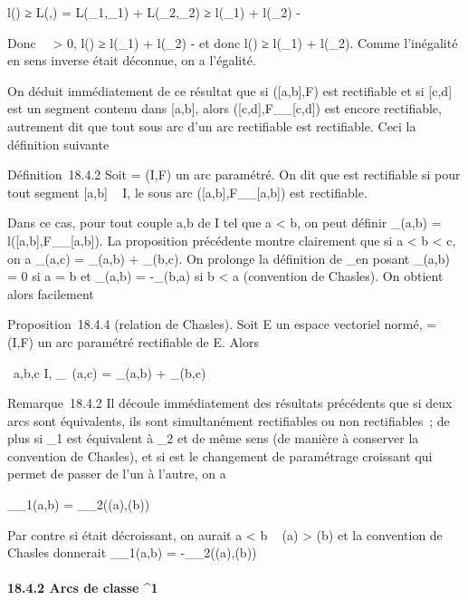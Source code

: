 \documentclass[]{article}
\begin{document}
l(\Gamma) ≥ L(\Gamma,\sigma) = L(\Gamma\_1,\sigma\_1) +
L(\Gamma\_2,\sigma\_2) ≥ l(\Gamma\_1) + l(\Gamma\_2) - \epsilon

Donc \forall~~\epsilon \textgreater{} 0, l(\Gamma) ≥
l(\Gamma\_1) + l(\Gamma\_2) - \epsilon et donc l(\Gamma) ≥ l(\Gamma\_1) +
l(\Gamma\_2). Comme l'inégalité en sens inverse était dé connue, on
a l'égalité.

On déduit immédiatement de ce résultat que si ({[}a,b{]},F) est
rectifiable et si {[}c,d{]} est un segment contenu dans {[}a,b{]}, alors
({[}c,d{]},F\_\textbar{}\_{[}c,d{]}) est encore
rectifiable, autrement dit que tout sous arc d'un arc rectifiable est
rectifiable. Ceci \jmathustifie la définition suivante

Définition~18.4.2 Soit \Gamma = (I,F) un arc paramétré. On dit que \Gamma est
rectifiable si pour tout segment {[}a,b{]} \subset~ I, le sous arc
({[}a,b{]},F\_\textbar{}\_{[}a,b{]}) est rectifiable.

Dans ce cas, pour tout couple a,b de I tel que a \textless{} b, on peut
définir \ell\_\Gamma(a,b) =
l({[}a,b{]},F\_\textbar{}\_{[}a,b{]}). La proposition
précédente montre clairement que si a \textless{} b \textless{} c, on a
\ell\_\Gamma(a,c) = \ell\_\Gamma(a,b) + \ell\_\Gamma(b,c). On prolonge
la définition de \ell\_\Gamma en posant \ell\_\Gamma(a,b) = 0 si a = b
et \ell\_\Gamma(a,b) = -\ell\_\Gamma(b,a) si b \textless{} a (convention
de Chasles). On obtient alors facilement

Proposition~18.4.4 (relation de Chasles). Soit E un espace vectoriel
normé, \Gamma = (I,F) un arc paramétré rectifiable de E. Alors

\forall~a,b,c \in I, \ell\_\Gamma~(a,c) =
\ell\_\Gamma(a,b) + \ell\_\Gamma(b,c)

Remarque~18.4.2 Il découle immédiatement des résultats précédents que si
deux arcs sont équivalents, ils sont simultanément rectifiables ou non
rectifiables~; de plus si \Gamma\_1 est équivalent à \Gamma\_2 et
de même sens (de manière à conserver la convention de Chasles), et si \theta
est le changement de paramétrage croissant qui permet de passer de l'un
à l'autre, on a

\ell\_\Gamma\_1(a,b) = \ell\_\Gamma\_2(\theta(a),\theta(b))

Par contre si \theta était décroissant, on aurait a \textless{} b \rigtharrow~ \theta(a)
\textgreater{} \theta(b) et la convention de Chasles donnerait
\ell\_\Gamma\_1(a,b) = -\ell\_\Gamma\_2(\theta(a),\theta(b))

\paragraph{18.4.2 Arcs de classe ^1}
\end{document}
